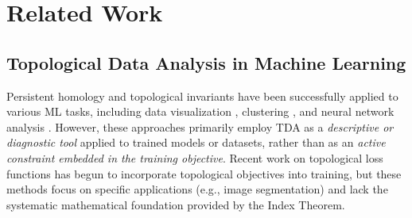 \documentclass[10pt,leqno]{amsart}
\begin{document}
\section{Related Work}
\subsection{Topological Data Analysis in Machine Learning}
Persistent homology and topological invariants have been successfully applied to various ML tasks, including data visualization \cite{carlsson2009topology}, clustering \cite{chazal2017introduction}, and neural network analysis \cite{naitzat2020topology}. However, these approaches primarily employ TDA as a \emph{descriptive or diagnostic tool} applied to trained models or datasets, rather than as an \emph{active constraint embedded in the training objective}. Recent work on topological loss functions \cite{hofer2017deep,clough2020topological} has begun to incorporate topological objectives into training, but these methods focus on specific applications (e.g., image segmentation) and lack the systematic mathematical foundation provided by the Index Theorem.
\end{document}
